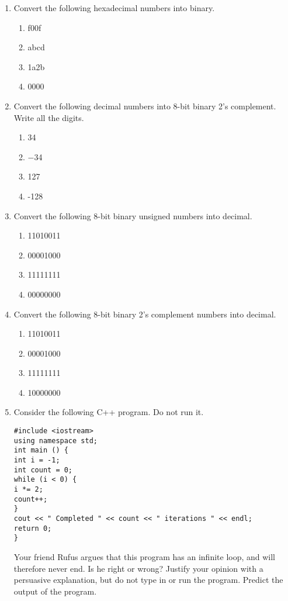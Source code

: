 \documentclass{article}
\begin{document}
\begin{enumerate}
    \item Convert the following hexadecimal numbers into binary.
    \begin{enumerate}
        \item f00f
        \item abcd
        \item 1a2b
        \item 0000
    \end{enumerate}

    \item Convert the following decimal numbers into 8-bit binary 2’s complement. Write all the digits.
    \begin{enumerate}
        \item 34
        \item −34
        \item 127
        \item -128
    \end{enumerate}

    \item Convert the following 8-bit binary unsigned numbers into decimal.
    \begin{enumerate}
        \item 11010011
        \item 00001000
        \item 11111111
        \item 00000000
    \end{enumerate}

    \item Convert the following 8-bit binary 2’s complement numbers into decimal.
    \begin{enumerate}
        \item 11010011
        \item 00001000
        \item 11111111
        \item 10000000
    \end{enumerate}

    \item Consider the following C++ program. Do not run it.
    \begin{verbatim}
#include <iostream>
using namespace std;
int main () {
int i = -1;
int count = 0;
while (i < 0) {
i *= 2;
count++;
}
cout << " Completed " << count << " iterations " << endl;
return 0;
}
    \end{verbatim}
    Your friend Rufus argues that this program has an infinite loop, and will therefore never end. Is he right or wrong? Justify your opinion with a persuasive explanation, but do not type in or run the program. Predict the output of the program.


\end{enumerate}
\end{document}
